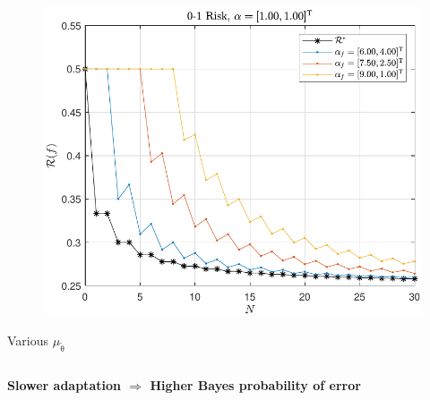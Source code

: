 \documentclass[aspectratio=169]{beamer}
\begin{document}
\begin{frame}
\begin{columns}[c]
\begin{column}{.5\linewidth}
\begin{figure}
\centering
\includegraphics[width=1\linewidth]{Risk_01_Dir_N_leg_f_mu.pdf}
\label{fig:Risk_01_Dir_N_leg_f_mu}
\end{figure}
\vspace{-2.5em}
\centering
\footnotesize
Various $\mu_{\tilde{\uptheta}}$

\end{column}

\end{columns}

\vspace{1em}
\centering
\textbf{Slower adaptation $\Rightarrow$ Higher Bayes probability of error}

\end{frame}
\end{document}
